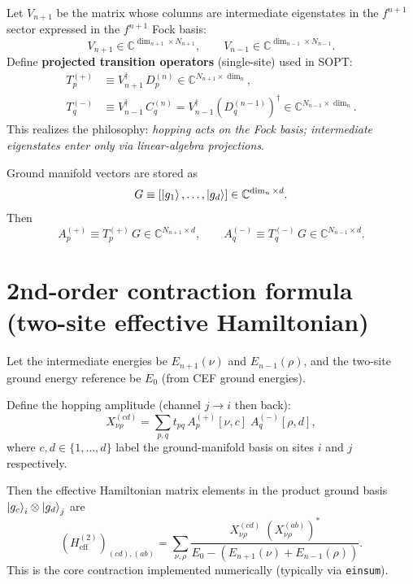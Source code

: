 \documentclass[11pt]{article}
\begin{document}
Let $V_{n+1}$ be the matrix whose columns are intermediate eigenstates in the $f^{n+1}$ sector expressed in the $f^{n+1}$ Fock basis:
\[
V_{n+1}\in \mathbb{C}^{\dim_{n+1}\times N_{n+1}},\qquad
V_{n-1}\in \mathbb{C}^{\dim_{n-1}\times N_{n-1}}.
\]
Define \textbf{projected transition operators} (single-site) used in SOPT:
\begin{align}
T^{(+)}_p &\equiv V_{n+1}^\dagger\, D_p^{(n)} \in \mathbb{C}^{N_{n+1}\times \dim_n},\\
T^{(-)}_q &\equiv V_{n-1}^\dagger\, C_q^{(n)} = V_{n-1}^\dagger \left(D_q^{(n-1)}\right)^\dagger
\in \mathbb{C}^{N_{n-1}\times \dim_n}.
\end{align}
This realizes the philosophy: \emph{hopping acts on the Fock basis; intermediate eigenstates enter only via linear-algebra projections}.

Ground manifold vectors are stored as
\[
G \equiv [\ket{g_1},\dots,\ket{g_d}] \in \mathbb{C}^{\dim_n\times d}.
\]
Then
\begin{equation}
A^{(+)}_p \equiv T^{(+)}_p\, G \in \mathbb{C}^{N_{n+1}\times d},\qquad
A^{(-)}_q \equiv T^{(-)}_q\, G \in \mathbb{C}^{N_{n-1}\times d}.
\end{equation}

\section{2nd-order contraction formula (two-site effective Hamiltonian)}
Let the intermediate energies be $E_{n+1}(\nu)$ and $E_{n-1}(\rho)$, and the two-site ground energy reference be $E_0$ (from CEF ground energies).

Define the hopping amplitude (channel $j\to i$ then back):
\begin{equation}
X_{\nu\rho}^{(c d)}=\sum_{p,q} t_{pq}\, A^{(+)}_p[\nu,c]\; A^{(-)}_q[\rho,d],
\end{equation}
where $c,d\in\{1,\dots,d\}$ label the ground-manifold basis on sites $i$ and $j$ respectively.

Then the effective Hamiltonian matrix elements in the product ground basis
$\ket{g_c}_i\otimes\ket{g_d}_j$ are
\begin{equation}
\left(H_{\text{eff}}^{(2)}\right)_{(cd),(ab)}
=
\sum_{\nu,\rho}
\frac{
X_{\nu\rho}^{(cd)}\; \left(X_{\nu\rho}^{(ab)}\right)^*
}{
E_0 - \left(E_{n+1}(\nu)+E_{n-1}(\rho)\right)
}.
\end{equation}
This is the core contraction implemented numerically (typically via \texttt{einsum}).
\end{document}
